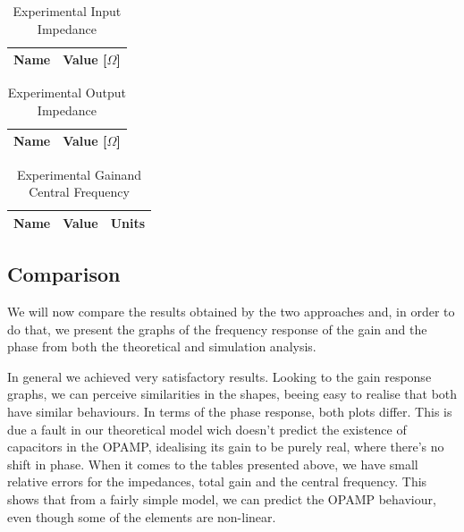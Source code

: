 \begin{table}[h]
    \centering
    \begin{tabular}{|l|c|}
    \hline
    {\bf Name} & {\bf Value [$\Omega$]} \\ \hline
    
    \end{tabular}
   \caption{Experimental Input Impedance}
   \label{tab:exp_in_imp}
\end{table}
\begin{table}[h]
    \centering
    \begin{tabular}{|l|c|}
    \hline
    {\bf Name} & {\bf Value [$\Omega$]} \\ \hline
    
    \end{tabular}
   \caption{Experimental Output Impedance}
   \label{tab:exp_out_imp}
\end{table}
\begin{table}[h]
    \centering
    \begin{tabular}{|l|c|c|}
    \hline
    {\bf Name} & {\bf Value} & {\bf Units}\\ \hline
    
    \end{tabular}
   \caption[Experimental Gain and Central Frequency]{Experimental Gain\footnotemark and Central Frequency}
   \label{tab:exp_gain_freq}
\end{table}

\subsection{Comparison}
\label{subsec:comparison}

We will now compare the results obtained by the two approaches and, in order to do that, we present the graphs of the frequency response of the gain and the phase from both the theoretical and simulation analysis.

In general we achieved very satisfactory results. Looking to the gain response graphs, we can perceive similarities in the shapes, beeing easy to realise that both have similar behaviours. In terms of the phase response, both plots differ. This is due a fault in our theoretical model wich doesn't predict the existence of capacitors in the OPAMP, idealising its gain to be purely real, where there's no shift in phase. When it comes to the tables presented above, we have small relative errors for the impedances, total gain and the central frequency. This shows that from a fairly simple model, we can predict the OPAMP behaviour, even though some of the elements are non-linear.



